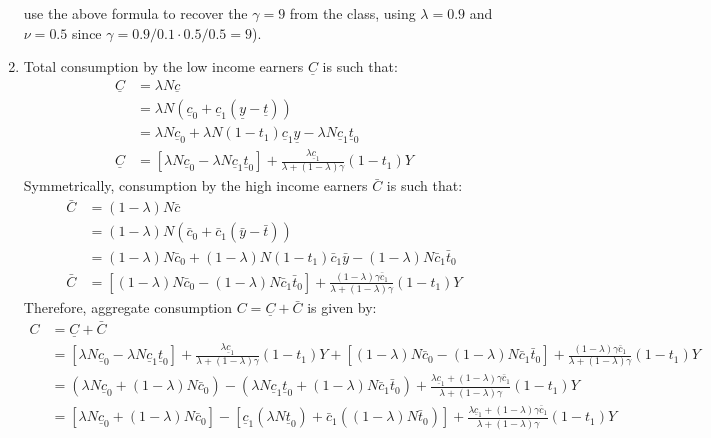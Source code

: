 \documentclass[]{book}
\begin{document}
\begin{enumerate}
  use the above formula to recover the \(\gamma = 9\) from the class,
  using \(\lambda = 0.9\) and \(\nu = 0.5\) since
  \(\gamma = 0.9/0.1 \cdot0.5/0.5 = 9\)).
\item
  Total consumption by the low income earners \(\underline{C}\) is such
  that: \[
  \begin{aligned}
  \underline{C}&=\lambda N \underline{c}\\
  &=\lambda N \left(\underline{c}_{0}+\underline{c}_{1}(\underline{y}-\underline{t})\right)\\
  &=\lambda N  \underline{c}_{0} + \lambda N  (1-t_1) \underline{c}_{1}\underline{y}-\lambda N  \underline{c}_{1} \underline{t}_0\\
  \underline{C}&=\left[\lambda N  \underline{c}_{0}-\lambda  N \underline{c}_{1} \underline{t}_0 \right]+ \frac{\lambda \underline{c}_{1}}{\lambda+(1-\lambda)\gamma}(1-t_1)Y
  \end{aligned}
  \] Symmetrically, consumption by the high income earners \(\bar{C}\)
  is such that: \[
  \begin{aligned}
  \bar{C}&=(1-\lambda) N \bar{c}\\
  &=(1-\lambda) N \left(\bar{c}_{0}+\bar{c}_{1}(\bar{y}-\bar{t})\right)\\
  &=(1-\lambda) N  \bar{c}_{0} + (1-\lambda) N (1-t_1) \bar{c}_{1}\bar{y}-(1-\lambda) N  \bar{c}_{1} \bar{t}_0\\
  \bar{C}&=\left[(1-\lambda) N  \bar{c}_{0}-(1-\lambda) N  \bar{c}_{1} \bar{t}_0\right] + \frac{(1-\lambda) \gamma\bar{c}_{1}}{\lambda+(1-\lambda)\gamma}(1-t_1)Y
  \end{aligned}
  \] Therefore, aggregate consumption \(C=\underline{C} + \bar{C}\) is
  given by: \[
  \begin{aligned}
  C&=\underline{C} + \bar{C}\\
  &=\left[\lambda N  \underline{c}_{0}-\lambda  N \underline{c}_{1} \underline{t}_0 \right]+ \frac{\lambda \underline{c}_{1}}{\lambda+(1-\lambda)\gamma}(1-t_1)Y + 
  \left[(1-\lambda)  N \bar{c}_{0}-(1-\lambda) N  \bar{c}_{1} \bar{t}_0\right] + 
  \frac{(1-\lambda) \gamma\bar{c}_{1}}{\lambda+(1-\lambda)\gamma}(1-t_1)Y\\
  &=\left(\lambda N  \underline{c}_{0}+(1-\lambda) N  \bar{c}_{0}\right)-\left(\lambda  N \underline{c}_{1} \underline{t}_0 +(1-\lambda) N  \bar{c}_{1} \bar{t}_0\right) +\frac{\lambda\underline{c}_{1}+\left(1-\lambda\right)\gamma\bar{c}_{1}}{\lambda+(1-\lambda)\gamma}(1-t_1)Y\\
  &=\left[\lambda N  \underline{c}_{0}+(1-\lambda) N  \bar{c}_{0}\right]-\left[\underline{c}_{1} (\lambda  N \underline{t}_0) + \bar{c}_{1} ((1-\lambda) N \bar{t}_0)\right] +\frac{\lambda\underline{c}_{1}+\left(1-\lambda\right)\gamma\bar{c}_{1}}{\lambda+(1-\lambda)\gamma}(1-t_1)Y\\

\end{aligned}\]
\end{enumerate}
\end{document}
